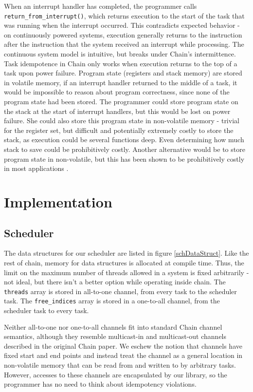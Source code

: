 \documentclass[11pt]{sensys-proc}
\newcommand{\chain}{Chain\xspace}
\begin{document}
When an interrupt handler has completed, the programmer calls
\texttt{return\_from\_interrupt()}, which returns execution to the start
of the task that was running when the interrupt occurred. This contradicts
expected behavior - on continuously powered systems, execution generally
returns to the instruction after the instruction that the system received an
interrupt while processing. The continuous system model is intuitive, but
breaks under \chain's intermittence. Task idempotence in \chain only works
when execution returns to the top of a task upon power failure. Program state
(registers and stack memory) are stored
in volatile memory, if an interrupt handler returned to the middle of a task,
it would be impossible to reason about program correctness, since none of the
program state had been stored. The programmer could store program state on the
stack at the start of interrupt handlers, but this would be lost on power
failure. She could also store this program state in non-volatile memory -
trivial for the register set, but difficult and potentially extremely costly to
store the stack, as execution could be several functions deep. Even determining
how much stack to save could be prohibitively costly. Another alternative would
be to store program state in non-volatile, but this has been shown to be
prohibitively costly in most applications \cite{Aware}.


\section{Implementation}
\subsection{Scheduler}

The data structures for our scheduler are listed in figure \ref{schDataStruct}.
Like the rest of chain, memory for data structures is allocated at compile
time. Thus, the limit on the maximum number of threads allowed in a system is
fixed arbitrarily - not ideal, but there isn't a better option while operating
inside chain. The \texttt{threads} array is stored in all-to-one channel, from
every task to the scheduler task. The \texttt{free\_indices} array is stored
in a one-to-all channel, from the scheduler task to every task.


Neither all-to-one nor one-to-all channels fit into standard \chain channel
semantics, although they resemble multicast-in and multicast-out channels
described in the original \chain paper. We eschew the notion that channels
have fixed start and end points and instead treat the channel as a general
location in non-volatile memory that can be read from and written to by
arbitrary tasks. However, accesses to these channels are encapsulated by our
library, so the programmer has no need to think about idempotency violations.
\end{document}
